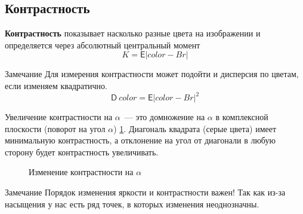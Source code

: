 \subsection{Контрастность}

\textbf{Контрастность} показывает насколько разные цвета на изображении и определяется через абсолютный центральный момент
$$K = \mathsf{E}|color - Br|$$

\begin{callout}{Замечание}
    Для измерения контрастности может подойти и дисперсия по цветам, если изменяем квадратично.
    $$\mathsf{D} \ color = \mathsf{E}|color - Br|^2$$
\end{callout}

Увеличение контрастности на $\alpha$~--- это домножение на $\alpha$ в комплексной плоскости (поворот на угол $\alpha$) \ref{fig:kontr}. Диагональ квадрата (серые цвета) имеет минимальную контрастность, а отклонение на угол от диагонали в любую сторону будет контрастность увеличивать.

\begin{figure}[h!]
    \centering
    \caption{Изменение контрастности на $\alpha$}
    \label{fig:kontr}
\end{figure}

\begin{callout}{Замечание}
    Порядок изменения яркости и контрастности важен!
    Так как из-за насыщения у нас есть ряд точек, в которых изменения неоднозначны.
\end{callout}

